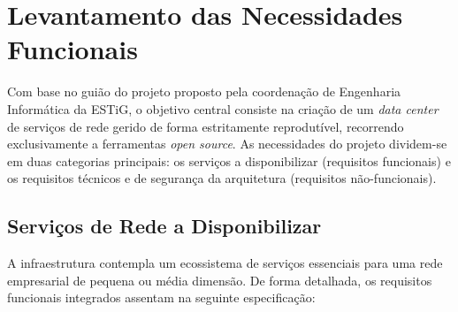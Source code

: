 \chapter{Levantamento das Necessidades Funcionais}
\label{chap:necessidades}

Com base no guião do projeto proposto pela coordenação de Engenharia Informática da ESTiG, o objetivo central consiste na criação de um \textit{data center} de serviços de rede gerido de forma estritamente reprodutível, recorrendo exclusivamente a ferramentas \textit{open source}. As necessidades do projeto dividem-se em duas categorias principais: os serviços a disponibilizar (requisitos funcionais) e os requisitos técnicos e de segurança da arquitetura (requisitos não-funcionais).

\section{Serviços de Rede a Disponibilizar}

A infraestrutura contempla um ecossistema de serviços essenciais para uma rede empresarial de pequena ou média dimensão. De forma detalhada, os requisitos funcionais integrados assentam na seguinte especificação:

